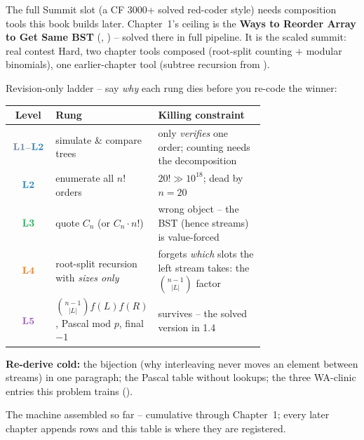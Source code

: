 
\begin{notebox}
The full Summit slot (a CF 3000+ solved red-coder style) needs composition tools this book builds later. Chapter~1's ceiling is the
 \textbf{Ways to Reorder Array to Get Same BST} (,
) -- solved there in full pipeline. It is the scaled summit:
real contest Hard, two chapter tools composed (root-split counting $+$ modular
binomials), one earlier-chapter tool (subtree recursion from ).
\end{notebox}

Revision-only ladder -- say \emph{why} each rung dies before you re-code the winner:

\begin{center}
\small
\renewcommand{\arraystretch}{1.25}
\begin{tabular}{@{}c p{0.30\linewidth} p{0.42\linewidth}@{}}
\toprule
\textbf{Level} & \textbf{Rung} & \textbf{Killing constraint} \\
\midrule
$\lv1$--$\lv2$ & simulate \& compare trees & only \emph{verifies} one order; counting needs the decomposition \\
$\lv2$ & enumerate all $n!$ orders & $20! \gg 10^{18}$; dead by $n=20$ \\
$\lv3$ & quote $C_n$ (or $C_n\cdot n!$) & wrong object -- the BST (hence streams) is value-forced \\
$\lv4$ & root-split recursion with \emph{sizes only} & forgets \emph{which} slots the left stream takes: the $\binom{n-1}{|L|}$ factor \\
$\lv5$ & $\binom{n-1}{|L|}f(L)f(R)$, Pascal mod $p$, final $-1$ & survives -- the solved version in 1.4 \\
\bottomrule
\end{tabular}
\end{center}

\noindent\textbf{Re-derive cold:} the bijection (why interleaving never moves an
element between streams) in one paragraph; the Pascal table without lookups; the three
WA-clinic entries this problem trains ().


The machine assembled so far -- cumulative through Chapter~1; every later chapter
appends rows and this table is where they are registered.

